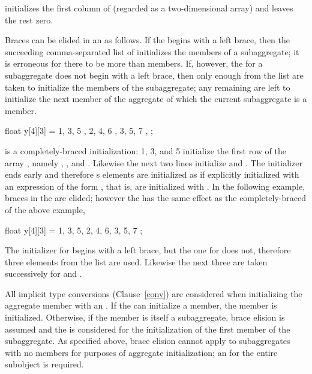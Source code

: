 initializes the first column of
(regarded as a two-dimensional array)
and leaves the rest zero.
\exitexample

\pnum
Braces can be elided in an
as follows.
If the
begins with a left brace,
then the succeeding comma-separated list of
initializes the members of a subaggregate;
it is erroneous for there to be more
than members.
If, however, the
for a subaggregate does not begin with a left brace,
then only enough
from the list are taken to initialize the members of the subaggregate;
any remaining
are left to initialize the next member of the aggregate
of which the current subaggregate is a member.
\enterexample

\begin{codeblock}
float y[4][3] = {
  { 1, 3, 5 },
  { 2, 4, 6 },
  { 3, 5, 7 },
};
\end{codeblock}

is a completely-braced initialization:
1, 3, and 5 initialize the first row of the array
,
namely
,
,
and
.
Likewise the next two lines initialize
and
.
The initializer ends early and therefore
s
elements are initialized as if explicitly initialized with an
expression of the form
,
that is, are initialized with
.
In the following example, braces in the
are elided;
however the
has the same effect as the completely-braced
of the above example,

\begin{codeblock}
float y[4][3] = {
  1, 3, 5, 2, 4, 6, 3, 5, 7
};
\end{codeblock}

The initializer for
begins with a left brace, but the one for
does not,
therefore three elements from the list are used.
Likewise the next three are taken successively for
and
.
\exitexample

\pnum
All implicit type conversions (Clause~\ref{conv}) are considered when
initializing the aggregate member with an .
If the
can initialize a member, the member is initialized.
Otherwise, if the member is itself a subaggregate,
brace elision is assumed and the
is considered for the initialization of the first member of the subaggregate.
\enternote As specified above, brace elision cannot apply to
subaggregates with no members for purposes of aggregate initialization; an
 for the entire subobject is
required.\exitnote

